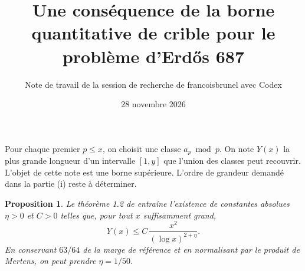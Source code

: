 \documentclass[11pt,a4paper]{article}
\title{Une conséquence de la borne quantitative de crible pour le problème d'Erdős 687}
\author{Note de travail de la session de recherche de francoisbrunel avec Codex}
\date{28 novembre 2026}
\newtheorem{proposition}{Proposition}
\begin{document}
\maketitle

Pour chaque premier $p\le x$, on choisit une classe $a_p\bmod p$.
On note $Y(x)$ la plus grande longueur d'un intervalle $[1,y]$ que l'union
des classes peut recouvrir. L'objet de cette note est une borne supérieure.
L'ordre de grandeur demandé dans la partie (i) reste à déterminer.

\begin{proposition}
Le théorème 1.2 de \cite{survivors} entraîne l'existence de constantes
absolues $\eta>0$ et $C>0$ telles que, pour tout $x$ suffisamment grand,
\[
                  Y(x) \le C\,\frac{x^2}{(\log x)^{2+\eta}} .
\]
En conservant $63/64$ de la marge de référence et en normalisant par
le produit de Mertens, on peut prendre $\eta=1/50$.
\end{proposition}
\end{document}
